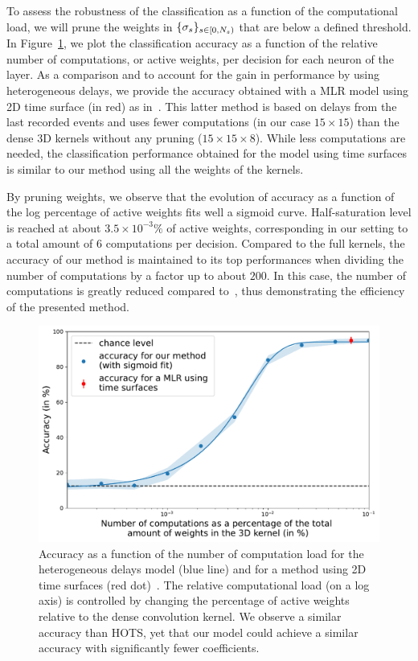 \documentclass[default]{sn-jnl}%
\theoremstyle{thmstyleone}%
\theoremstyle{thmstyletwo}%
\theoremstyle{thmstylethree}%
\begin{document}
To assess the robustness of the classification as a function of the computational load, we will prune the weights in $\{\sigma_s\}_{s \in [0,N_{s})}$ that are below a defined threshold. In Figure~\ref{fig:accuracy}, we plot the classification accuracy as a function of the relative number of computations, or active weights, per decision for each neuron of the layer. As a comparison and to account for the gain in performance by using heterogeneous delays, we provide the accuracy obtained with a MLR model using 2D time surface (in red) as in~\citep{grimaldi_robust_2022}. This latter method is based on delays from the last recorded events and uses fewer computations (in our case $15\times15$) than the dense 3D kernels without any pruning ($15\times15\times8$). While less computations are needed, the classification performance obtained for the model using time surfaces is similar to our method using all the weights of the kernels.

By pruning weights, we observe that the evolution of accuracy as a function of the log percentage of active weights fits well a sigmoid curve. Half-saturation level is reached at about $3.5\times 10^{-3}\%$ of active weights, corresponding in our setting to a total amount of $6$ computations per decision. Compared to the full kernels, the accuracy of our method is maintained to its top performances when dividing the number of computations by a factor up to about $200$. In this case, the number of computations is greatly reduced compared to~\citep{grimaldi_robust_2022}, thus demonstrating the efficiency of the presented method. 

%
\begin{figure}%
    \centering
    \includegraphics[width=0.95\linewidth]{figures/accuracy.pdf}
    \caption{Accuracy as a function of the number of computation load for the heterogeneous delays model (blue line) and for a method using 2D time surfaces (red dot)~\citep{grimaldi_robust_2022}. The relative computational load (on a log axis) is controlled by changing the percentage of active weights relative to the dense convolution kernel. We observe a similar accuracy than HOTS, yet that our model could achieve a similar accuracy with significantly fewer coefficients.}
    \label{fig:accuracy}
\end{figure}
\end{document}
